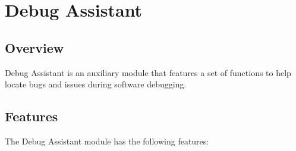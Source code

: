 \documentclass[main\_\_EN.tex]{subfiles}
\begin{document}
\setenglishformatting

\ifglobal
\else
    \clearpage
    \listoftodos
    \listofdonetodos
    \tableofcontents
\fi



\hypertarget{dbgassist}{}
\chapter{Debug Assistant}
\label{mod:dbgassist}

\section{Overview}

Debug Assistant is an auxiliary module that features a set of functions to help locate bugs and issues during software debugging.

\section{Features}
\label{sec:dbgassist-features}

The Debug Assistant module has the following features:
\end{document}
